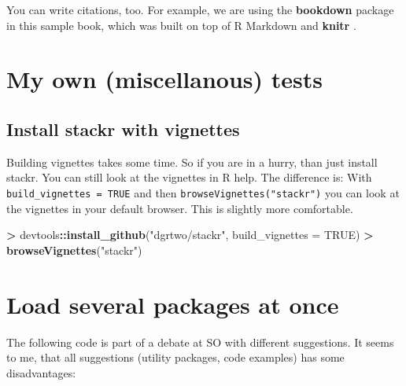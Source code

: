 \documentclass[]{book}
\newenvironment{Shaded}{\begin{snugshade}}{\end{snugshade}}
\newcommand{\KeywordTok}[1]{\textcolor[rgb]{0.13,0.29,0.53}{\textbf{#1}}}
\newcommand{\DataTypeTok}[1]{\textcolor[rgb]{0.13,0.29,0.53}{#1}}
\newcommand{\StringTok}[1]{\textcolor[rgb]{0.31,0.60,0.02}{#1}}
\newcommand{\OtherTok}[1]{\textcolor[rgb]{0.56,0.35,0.01}{#1}}
\newcommand{\OperatorTok}[1]{\textcolor[rgb]{0.81,0.36,0.00}{\textbf{#1}}}
\newcommand{\NormalTok}[1]{#1}
\theoremstyle{definition}
\theoremstyle{definition}
\theoremstyle{definition}
\theoremstyle{remark}
\begin{document}
You can write citations, too. For example, we are using the
\textbf{bookdown} package \citep{R-bookdown} in this sample book, which
was built on top of R Markdown and \textbf{knitr} \citep{xie2015}.

\section{My own (miscellanous) tests}\label{my-own-miscellanous-tests}

\subsection{Install stackr with
vignettes}\label{install-stackr-with-vignettes}

Building vignettes takes some time. So if you are in a hurry, than just
install stackr. You can still look at the vignettes in R help. The
difference is: With \texttt{build\_vignettes\ =\ TRUE} and then
\texttt{browseVignettes("stackr")} you can look at the vignettes in your
default browser. This is slightly more comfortable.

\begin{Shaded}
\begin{Highlighting}[]
\OperatorTok{>}\StringTok{ }\NormalTok{devtools}\OperatorTok{::}\KeywordTok{install_github}\NormalTok{(}\StringTok{"dgrtwo/stackr"}\NormalTok{, }\DataTypeTok{build_vignettes =} \OtherTok{TRUE}\NormalTok{)}
\OperatorTok{>}\StringTok{ }\KeywordTok{browseVignettes}\NormalTok{(}\StringTok{"stackr"}\NormalTok{)}
\end{Highlighting}
\end{Shaded}

\section{Load several packages at
once}\label{load-several-packages-at-once}

The following code is part of a debate at SO with different suggestions.
It seems to me, that all suggestions (utility packages, code examples)
has some disadvantages:
\end{document}
